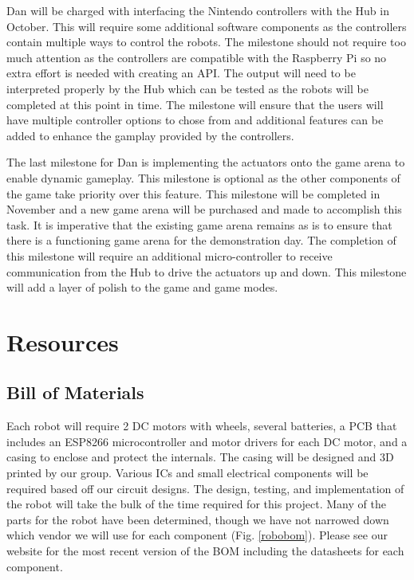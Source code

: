 \documentclass[11pt]{ieeeconf}
\begin{document}
Dan will be charged with interfacing the Nintendo controllers with the Hub in October. This will require some additional software components as the controllers contain multiple ways to control the robots. The milestone should not require too much attention as the controllers are compatible with the Raspberry Pi so no extra effort is needed with creating an API. The output will need to be interpreted properly by the Hub which can be tested as the robots will be completed at this point in time. The milestone will ensure that the users will have multiple controller options to chose from and additional features can be added to enhance the gamplay provided by the controllers.

The last milestone for Dan is implementing the actuators onto the game arena to enable dynamic gameplay. This milestone is optional as the other components of the game take priority over this feature. This milestone will be completed in November and a new game arena will be purchased and made to accomplish this task. It is imperative that the existing game arena remains as is to ensure that there is a functioning game arena for the demonstration day. The completion of this milestone will require an additional micro-controller to receive communication from the Hub to drive the actuators up and down. This milestone will add a layer of polish to the game and game modes.

\section{Resources}
\subsection{Bill of Materials}

Each robot will require 2 DC motors with wheels, several batteries, a PCB that includes an ESP8266 microcontroller and motor drivers for each DC motor, and a casing to enclose and protect the internals. The casing will be designed and 3D printed by our group. Various ICs and small electrical components will be required based off our circuit designs. The design, testing, and implementation of the robot will take the bulk of the time required for this project. Many of the parts for the robot have been determined, though we have not narrowed down which vendor we will use for each component (Fig. \ref{robobom}). Please see our website for the most recent version of the BOM including the datasheets for each component.
\end{document}
